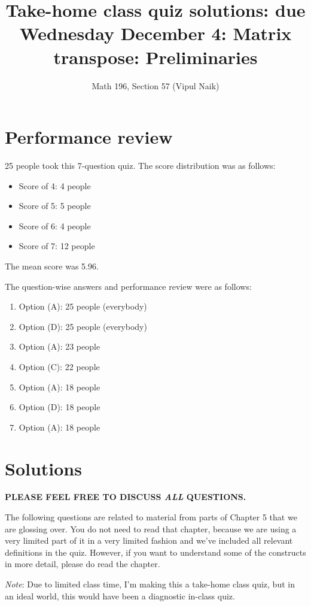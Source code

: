 \documentclass[10pt]{amsart}
\title{Take-home class quiz solutions: due Wednesday December 4: Matrix transpose: Preliminaries}
\author{Math 196, Section 57 (Vipul Naik)}
\begin{document}
\maketitle

\section{Performance review}

25 people took this 7-question quiz. The score distribution was as follows:

\begin{itemize}
\item Score of 4: 4 people
\item Score of 5: 5 people
\item Score of 6: 4 people
\item Score of 7: 12 people
\end{itemize}

The mean score was 5.96.

The question-wise answers and performance review were as follows:

\begin{enumerate}
\item Option (A): 25 people (everybody)
\item Option (D): 25 people (everybody)
\item Option (A): 23 people
\item Option (C): 22 people
\item Option (A): 18 people
\item Option (D): 18 people
\item Option (A): 18 people
\end{enumerate}

\section{Solutions}

{\bf PLEASE FEEL FREE TO DISCUSS {\em ALL} QUESTIONS.}

The following questions are related to material from parts of Chapter
5 that we are glossing over. You do not need to read that chapter,
because we are using a very limited part of it in a very limited
fashion and we've included all relevant definitions in the
quiz. However, if you want to understand some of the constructs in
more detail, please do read the chapter.

{\em Note}: Due to limited class time, I'm making this a take-home
class quiz, but in an ideal world, this would have been a diagnostic
in-class quiz.
\end{document}
